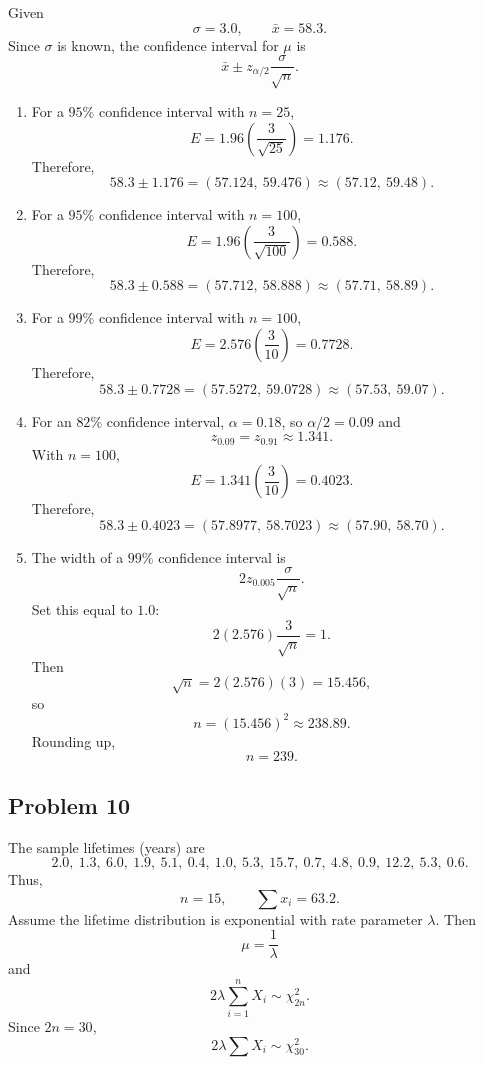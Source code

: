 \documentclass[11pt]{article}
\begin{document}
Given
\[
\sigma=3.0, \qquad \bar{x}=58.3.
\]
Since $\sigma$ is known, the confidence interval for $\mu$ is
\[
\bar{x}\pm z_{\alpha/2}\frac{\sigma}{\sqrt{n}}.
\]

\begin{enumerate}
\item[(a)] For a $95\%$ confidence interval with $n=25$,
\[
E=1.96\left(\frac{3}{\sqrt{25}}\right)=1.176.
\]
Therefore,
\[
58.3\pm 1.176=(57.124,\ 59.476)\approx(57.12,\ 59.48).
\]

\item[(b)] For a $95\%$ confidence interval with $n=100$,
\[
E=1.96\left(\frac{3}{\sqrt{100}}\right)=0.588.
\]
Therefore,
\[
58.3\pm 0.588=(57.712,\ 58.888)\approx(57.71,\ 58.89).
\]

\item[(c)] For a $99\%$ confidence interval with $n=100$,
\[
E=2.576\left(\frac{3}{10}\right)=0.7728.
\]
Therefore,
\[
58.3\pm 0.7728=(57.5272,\ 59.0728)\approx(57.53,\ 59.07).
\]

\item[(d)] For an $82\%$ confidence interval, $\alpha=0.18$, so $\alpha/2=0.09$ and
\[
z_{0.09}=z_{0.91}\approx 1.341.
\]
With $n=100$,
\[
E=1.341\left(\frac{3}{10}\right)=0.4023.
\]
Therefore,
\[
58.3\pm 0.4023=(57.8977,\ 58.7023)\approx(57.90,\ 58.70).
\]

\item[(e)] The width of a $99\%$ confidence interval is
\[
2z_{0.005}\frac{\sigma}{\sqrt{n}}.
\]
Set this equal to $1.0$:
\[
2(2.576)\frac{3}{\sqrt{n}}=1.
\]
Then
\[
\sqrt{n}=2(2.576)(3)=15.456,
\]
so
\[
n=(15.456)^2\approx 238.89.
\]
Rounding up,
\[
n=239.
\]
\end{enumerate}

\subsection*{Problem 10}

The sample lifetimes (years) are
\[
2.0,\ 1.3,\ 6.0,\ 1.9,\ 5.1,\ 0.4,\ 1.0,\ 5.3,\ 15.7,\ 0.7,\ 4.8,\ 0.9,\ 12.2,\ 5.3,\ 0.6.
\]
Thus,
\[
n=15, \qquad \sum x_i=63.2.
\]
Assume the lifetime distribution is exponential with rate parameter $\lambda$. Then
\[
\mu=\frac{1}{\lambda}
\]
and
\[
2\lambda\sum_{i=1}^{n}X_i\sim \chi^2_{2n}.
\]
Since $2n=30$,
\[
2\lambda\sum X_i\sim \chi^2_{30}.
\]
\end{document}
